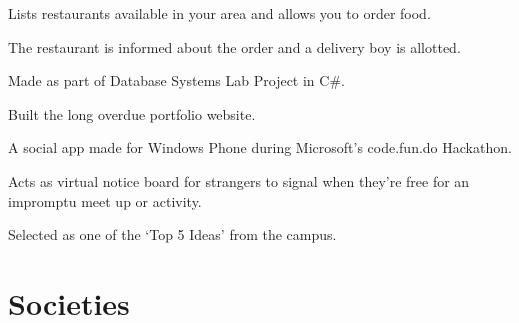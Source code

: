 \documentclass[a4paper]{resume}
\begin{document}
\begin{minipage}[t]{0.66\textwidth}
\sectionspace %




\begin{tightitemize}
\item Lists restaurants available in your area and allows you to order food.
\item The restaurant is informed about the order and a delivery boy is allotted.
\item Made as part of Database Systems Lab Project in C\#.
\end{tightitemize}

\sectionspace %




\begin{tightitemize}
\item Built the long overdue portfolio website.
\end{tightitemize}

\sectionspace %




\begin{tightitemize}
\item A social app made for Windows Phone during Microsoft’s code.fun.do Hackathon.
\item Acts as virtual notice board for strangers to signal when they’re free for an impromptu meet up or activity.
\item Selected as one of the ‘Top 5 Ideas’ from the campus.
\end{tightitemize}

\sectionspace %


\section{Societies}


\end{minipage}
\end{document}
